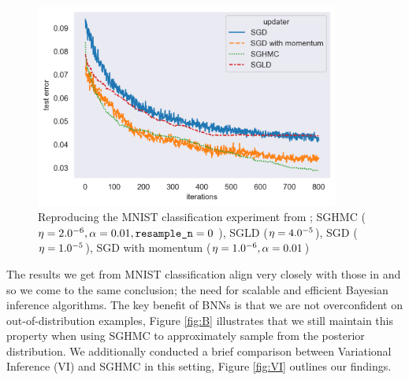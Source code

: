\begin{figure}[h!]
\centering
\includegraphics[width=100mm]{parts/Images/MNIST.png}
\caption{Reproducing the MNIST classification experiment from \cite{sghmc}; SGHMC ($\eta = 2.0\time10^{-6}, \alpha=0.01, \texttt{resample\_n} =0$ ), SGLD ($\eta = 4.0\time10^{-5}$), SGD ($\eta = 1.0\time10^{-5}$), SGD with momentum ($\eta = 1.0\time10^{-6}, \alpha=0.01$)}
\label{fig:MNIST}
\end{figure}
The results we get from MNIST classification align very closely with those in \cite{sghmc} and so we come to the same conclusion; the need for scalable and efficient Bayesian inference algorithms. The key benefit of BNNs is that we are not overconfident on out-of-distribution examples, Figure \ref{fig:B} illustrates that we still maintain this property when using SGHMC to approximately sample from the posterior distribution. We additionally conducted a brief comparison between Variational Inference (VI) and SGHMC in this setting, Figure \ref{fig:VI} outlines our findings.
